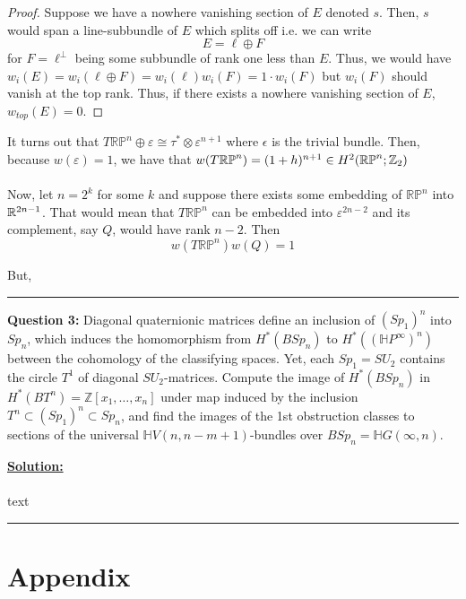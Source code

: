 \documentclass[11pt]{article}
\begin{document}
\begin{proof}
  Suppose we have a nowhere vanishing section of $E$ denoted $s$. Then, $s$ would span a line-subbundle of $E$ which splits off i.e. we can write $$E = \ell \oplus F$$ for $F = \ell^{\perp}$ being some subbundle of rank one less than $E$. Thus, we would have $w_i(E) = w_i(\ell \oplus F) = w_i(\ell) w_i(F) = 1 \cdot w_i(F)$ but $w_i(F)$ should vanish at the top rank. Thus, if there exists a nowhere vanishing section of $E$, $w_{top}(E) = 0$.
\end{proof}

It turns out that $T\mathbb{RP}^n \oplus \varepsilon \cong \tau^* \otimes \varepsilon^{n+1}$ where $\epsilon$ is the trivial bundle. Then, because $w(\varepsilon) = 1$, we have that $w(T\mathbb{RP}^n) = (1+h)^{n+1} \in H^2(\mathbb{RP}^n; \mathbb{Z}_2)$
\\
\\
Now, let $n = 2^k$ for some $k$ and suppose there exists some embedding of $\mathbb{RP}^n$ into $\mathbb{R}^{2n-1}$. That would mean that $T \mathbb{RP}^n$ can be embedded into $\varepsilon^{2n-2}$ and its complement, say $Q$, would have rank $n-2$. Then $$w(T\mathbb{RP}^n)w(Q) = 1$$

But, 


\vskip 0.5cm
\hrule
\pagebreak


\begin{bluebox}
  \textbf{Question 3:} Diagonal quaternionic matrices define an inclusion of $(Sp_1)^n$ into $Sp_n$, which induces the homomorphism from $H^*(BSp_n)$ to $H^*((\mathbb{H} P^{\infty})^n)$ between the cohomology of the classifying spaces. Yet, each $Sp_1=SU_2$ contains the circle $T^1$ of diagonal $SU_2$-matrices. Compute the image of $H^*(BSp_n)$ in $H^*(BT^n)=\mathbb{Z}[x_1,\dots,x_n]$ under map induced by the inclusion $T^n\subset (Sp_1)^n\subset Sp_n$, and find the images of the 1st obstruction classes to sections of the universal $\mathbb{H} V(n,n-m+1)$-bundles over $BSp_n = \mathbb{H} G(\infty, n)$.

\end{bluebox}

\vskip 0.5cm
\textbf{\underline{Solution:}}
\\
\\
text
\vskip 0.5cm
\hrule
\pagebreak


\section{Appendix}
\end{document}
